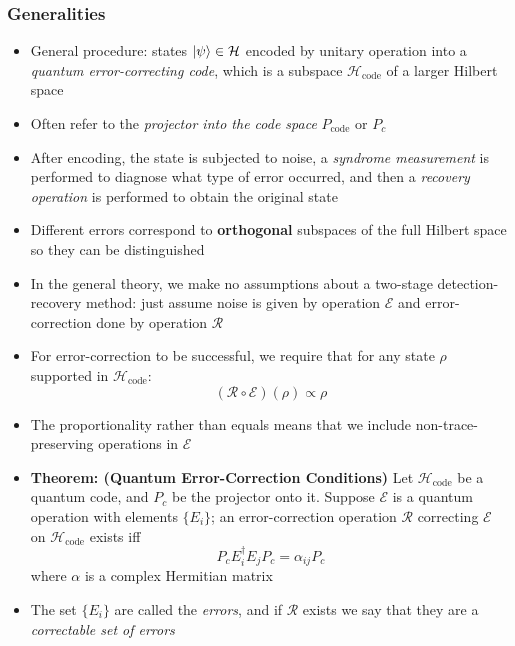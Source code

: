 \documentclass[12pt,a4paper]{article}
\numberwithin{equation}{section}
\begin{document}
	\subsubsection{Generalities}
	\begin{itemize}
		\item General procedure: states $\ket{\psi}\in\mathcal{H}$ encoded by unitary operation into a \textit{quantum error-correcting code}, which is a subspace $\mathcal{H}_{\text{code}}$ of a larger Hilbert space
		\item Often refer to the \textit{projector into the code space} $P_{\text{code}}$ or $P_{c}$
		\item After encoding, the state is subjected to noise, a \textit{syndrome measurement} is performed to diagnose what type of error occurred, and then a \textit{recovery operation} is performed to obtain the original state
		\item Different errors correspond to \textbf{orthogonal} subspaces of the full Hilbert space so they can be distinguished
		\item In the general theory, we make no assumptions about a two-stage detection-recovery method: just assume noise is given by operation $\mathcal{E}$ and error-correction done by operation $\mathcal{R}$
		\item For error-correction to be successful, we require that for any state $\rho$ supported in $\mathcal{H}_{\text{code}}$:
		\begin{equation} \label{Successful EC}
			(\mathcal{R}\circ\mathcal{E})(\rho)\propto \rho
		\end{equation}
		\item The proportionality rather than equals means that we include non-trace-preserving operations in $\mathcal{E}$
		\item \textbf{Theorem: (Quantum Error-Correction Conditions)} Let $\mathcal{H}_{\text{code}}$ be a quantum code, and $P_{c}$ be the projector onto it. Suppose $\mathcal{E}$ is a quantum operation with elements $\{E_{i}\}$; an error-correction operation $\mathcal{R}$ correcting $\mathcal{E}$ on $\mathcal{H}_{\text{code}}$ exists iff
		\begin{equation} \label{QEC conditions}
			P_{c}E_{i}^{\dagger}E_{j}P_{c}=\alpha_{ij}P_{c}
		\end{equation}
		where $\alpha$ is a complex Hermitian matrix
		\item The set $\{E_{i}\}$ are called the \textit{errors}, and if $\mathcal{R}$ exists we say that they are a \textit{correctable set of errors}

\end{itemize}
\end{document}
